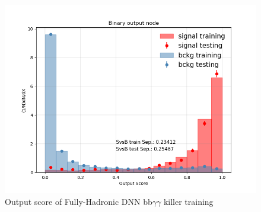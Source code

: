 \begin{figure}[!htbp]
  \centering
  \includegraphics[scale=0.6]{Sections/HHWWgg/images/FH_DNN/BBgg/overfitting_plot_BinaryClassifier_Binary.png}%
  \caption{Output score of Fully-Hadronic DNN bb$\gamma \gamma$ killer training}
  \label{fig:FH_DNN_OutputScore_bbggVsAll}
\end{figure}

\clearpage



% 

